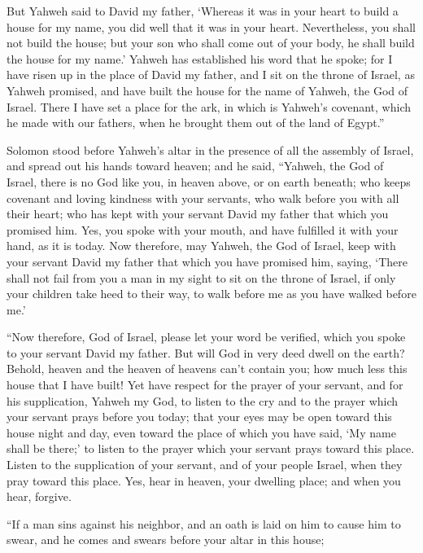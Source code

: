 {But Yahweh said to David my father, ‘Whereas it was in your heart to build a house for my name, you did well that it was in your heart.
Nevertheless, you shall not build the house; but your son who shall come out of your body, he shall build the house for my name.’
Yahweh has established his word that he spoke; for I have risen up in the place of David my father, and I sit on the throne of Israel, as Yahweh promised, and have built the house for the name of Yahweh, the God of Israel.
There I have set a place for the ark, in which is Yahweh’s covenant, which he made with our fathers, when he brought them out of the land of Egypt.”
\par }{\PP {}Solomon stood before Yahweh’s altar in the presence of all the assembly of Israel, and spread out his hands toward heaven;
and he said, “Yahweh, the God of Israel, there is no God like you, in heaven above, or on earth beneath; who keeps covenant and loving kindness with your servants, who walk before you with all their heart;
who has kept with your servant David my father that which you promised him. Yes, you spoke with your mouth, and have fulfilled it with your hand, as it is today.
Now therefore, may Yahweh, the God of Israel, keep with your servant David my father that which you have promised him, saying, ‘There shall not fail from you a man in my sight to sit on the throne of Israel, if only your children take heed to their way, to walk before me as you have walked before me.’
\par }{\PP {}“Now therefore, God of Israel, please let your word be verified, which you spoke to your servant David my father.
But will God in very deed dwell on the earth? Behold, heaven and the heaven of heavens can’t contain you; how much less this house that I have built!
Yet have respect for the prayer of your servant, and for his supplication, Yahweh my God, to listen to the cry and to the prayer which your servant prays before you today;
that your eyes may be open toward this house night and day, even toward the place of which you have said, ‘My name shall be there;’ to listen to the prayer which your servant prays toward this place.
Listen to the supplication of your servant, and of your people Israel, when they pray toward this place. Yes, hear in heaven, your dwelling place; and when you hear, forgive.
\par }{\PP {}“If a man sins against his neighbor, and an oath is laid on him to cause him to swear, and he comes and swears before your altar in this house;
}
